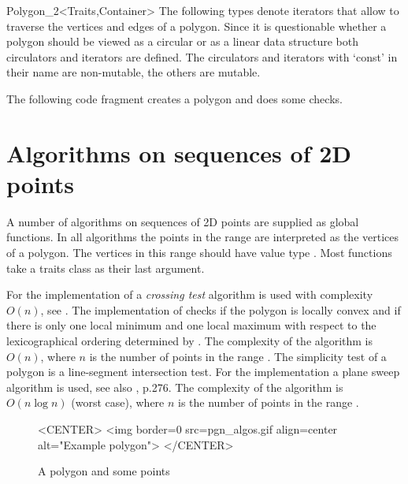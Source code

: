 \begin{ccClassTemplate}{Polygon_2<Traits,Container>}
The following types denote iterators that allow to traverse the vertices and
edges of a polygon. 
Since it is questionable whether a polygon should be viewed as a circular or 
as a linear data structure both circulators and iterators are defined.
The circulators and iterators with `const' in their name are non-mutable, the 
others are mutable.

\ccExample


The following code fragment creates a polygon and does some checks.


\end{ccClassTemplate}

\section{Algorithms on sequences of 2D points \label{sec:poly_algo}}

A number of algorithms on sequences of 2D points are supplied as global functions.
In all algorithms the points in the range \ccStyle{[first,last)} are interpreted
as the vertices of a polygon. The vertices in this range should have value type
. Most functions take a traits class as their last argument.

For the implementation of  
a {\em crossing test} algorithm is used with complexity
$O(n)$, see \cite{h-pps-94}.
The implementation of  checks if the polygon is locally convex
and if there is only one local minimum and one local maximum with respect to
the lexicographical ordering determined by
.
The complexity of the algorithm is $O(n)$, where $n$ is the number of points
in the range \ccStyle{[first,last)}.
The simplicity test  of a polygon is a line-segment 
intersection test. For the implementation a plane sweep algorithm is used, see also 
\cite{ps-cgi-85}, p.276.
The complexity of the algorithm is $O(n \log n)$ (worst case), where $n$ is 
the number of points in the range \ccStyle{[first,last)}.


\begin{figure}
\begin{ccTexOnly}
\begin{center}   \end{center}
\end{ccTexOnly}
\caption{A polygon and some points
\label{I1_Fig_a_polygon}}
\begin{ccHtmlOnly}
<CENTER>
<img border=0 src=pgn_algos.gif align=center alt="Example polygon">
</CENTER>
\end{ccHtmlOnly}
\end{figure}

